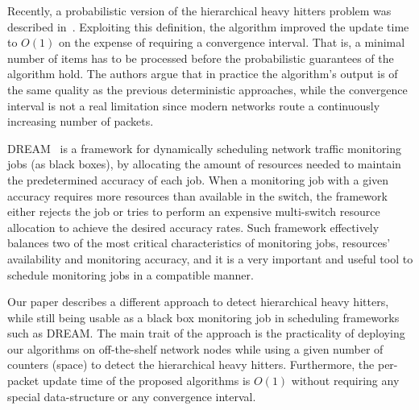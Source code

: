 Recently, a probabilistic version of the hierarchical heavy hitters problem was described in~\cite{ben2017constant}. Exploiting this definition, the algorithm improved the update time to $O(1)$ on the expense of requiring a convergence interval. That is, a minimal number of items has to be processed before the probabilistic guarantees of the algorithm hold. The authors argue that in practice the algorithm's output is of the same quality as the previous deterministic approaches, while the convergence interval is not a real limitation since modern networks route a continuously increasing number of packets.

DREAM~\cite{Moshref2014} is a framework for dynamically scheduling network traffic monitoring jobs (as black boxes), by allocating the amount of resources needed to maintain the predetermined accuracy of each job. When a monitoring job with a given accuracy requires more resources than  available in the switch, the framework either rejects the job or tries to perform an expensive multi-switch resource allocation to achieve the desired accuracy rates.
Such framework effectively balances two of the most critical characteristics of monitoring jobs, resources' availability and monitoring accuracy, and it is a very important and useful tool  to schedule monitoring jobs in a compatible manner.

Our paper describes a different approach to detect hierarchical heavy hitters,
while still being usable as a black box monitoring job in scheduling frameworks such as DREAM. The main trait of the approach is the practicality of deploying our algorithms on off-the-shelf network nodes while using a given number of counters (space) to detect the hierarchical heavy hitters. Furthermore, the per-packet update time of the proposed algorithms is $O(1)$ without requiring any special data-structure or any convergence interval.